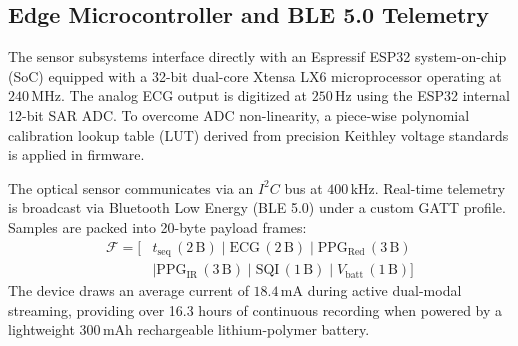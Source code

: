 \subsection{Edge Microcontroller and BLE 5.0 Telemetry}
The sensor subsystems interface directly with an Espressif ESP32 system-on-chip (SoC) equipped with a 32-bit dual-core Xtensa LX6 microprocessor operating at $240$\,MHz. The analog ECG output is digitized at $250$\,Hz using the ESP32 internal 12-bit SAR ADC. To overcome ADC non-linearity, a piece-wise polynomial calibration lookup table (LUT) derived from precision Keithley voltage standards is applied in firmware.

The optical sensor communicates via an $I^2C$ bus at $400$\,kHz. Real-time telemetry is broadcast via Bluetooth Low Energy (BLE 5.0) under a custom GATT profile. Samples are packed into 20-byte payload frames:
\begin{align}
    \mathcal{F} = [ & t_{\text{seq}} \, (2\,\text{B}) \mid \text{ECG} \, (2\,\text{B}) \mid \text{PPG}_{\text{Red}} \, (3\,\text{B}) \nonumber \\
    & \mid \text{PPG}_{\text{IR}} \, (3\,\text{B}) \mid \text{SQI} \, (1\,\text{B}) \mid V_{\text{batt}} \, (1\,\text{B}) ]
\end{align}
The device draws an average current of $18.4\,\text{mA}$ during active dual-modal streaming, providing over 16.3 hours of continuous recording when powered by a lightweight $300\,\text{mAh}$ rechargeable lithium-polymer battery.
